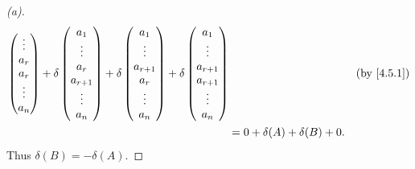 \begin{proof}[(a)]
\begin{align*}
\begin{pmatrix}
                  \vdots \\
                  a_r    \\
                  a_r    \\
                  \vdots \\
                  a_n
                \end{pmatrix} + \delta\begin{pmatrix}
                                        a_1       \\
                                        \vdots    \\
                                        a_r       \\
                                        a_{r + 1} \\
                                        \vdots    \\
                                        a_n
                                      \end{pmatrix} + \delta\begin{pmatrix}
                                                              a_1       \\
                                                              \vdots    \\
                                                              a_{r + 1} \\
                                                              a_r       \\
                                                              \vdots    \\
                                                              a_n
                                                            \end{pmatrix} + \delta\begin{pmatrix}
                                                                                    a_1       \\
                                                                                    \vdots    \\
                                                                                    a_{r + 1} \\
                                                                                    a_{r + 1} \\
                                                                                    \vdots    \\
                                                                                    a_n
                                                                                  \end{pmatrix} &  & \text{(by \cref{4.5.1})} \\
      & = 0 + \delta(A) + \delta(B) + 0.
  \end{align*}
  Thus \(\delta(B) = -\delta(A)\).


\end{proof}
